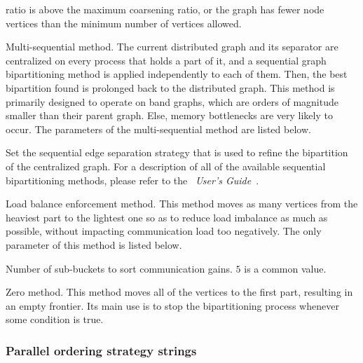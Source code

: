 \begin{itemize}
\begin{itemize}
\begin{itemize}
ratio is above the maximum coarsening ratio, or the graph
has fewer node vertices than the minimum number of vertices allowed.
\end{itemize}
\iteme[{\tt q}]
Multi-sequential method. The current distributed graph and its
separator are centralized on every process that holds a part of it, and
a sequential graph bipartitioning method is applied independently to each
of them. Then, the best bipartition found is prolonged back to the
distributed graph. This method is primarily designed to operate on
band graphs, which are orders of magnitude smaller than their parent
graph. Else, memory bottlenecks are very likely to occur.
The parameters of the multi-sequential method are listed below.
\begin{itemize}
\iteme[{\tt strat=}{\it strat}]
Set the sequential edge separation strategy that is used to refine
the bipartition of the centralized graph. For a description of all of
the available sequential bipartitioning methods, please refer to the
{\it\scotch\ User's Guide}~\scotchcitesuser.
\end{itemize}
\iteme[{\tt x}]
Load balance enforcement method. This method moves as many vertices
from the heaviest part to the lightest one so as to reduce load
imbalance as much as possible, without impacting communication load
too negatively. The only parameter of this method is listed below.
\begin{itemize}
\iteme[{\tt sbbt=}{\it nbr}]
Number of sub-buckets to sort communication gains. $5$ is a common
value.
\end{itemize}
\iteme[{\tt z}]
Zero method. This method moves all of the vertices to the first
part, resulting in an empty frontier. Its main use is to stop the
bipartitioning process whenever some condition is true.
\end{itemize}
\end{itemize}

\subsubsection{Parallel ordering strategy strings}
\label{sec-lib-format-pord}

